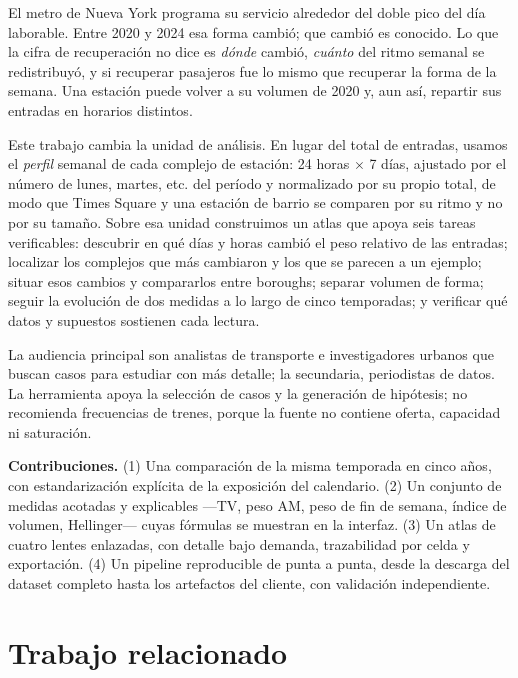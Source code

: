 \IfFileExists{IEEEtran.cls}{\documentclass[conference]{IEEEtran}}{\documentclass[10pt,twocolumn]{article}}
\begin{document}
El metro de Nueva York programa su servicio alrededor del doble pico del día laborable. Entre 2020 y 2024 esa forma cambió; que cambió es conocido. Lo que la cifra de recuperación no dice es \emph{dónde} cambió, \emph{cuánto} del ritmo semanal se redistribuyó, y si recuperar pasajeros fue lo mismo que recuperar la forma de la semana. Una estación puede volver a su volumen de 2020 y, aun así, repartir sus entradas en horarios distintos.

Este trabajo cambia la unidad de análisis. En lugar del total de entradas, usamos el \emph{perfil} semanal de cada complejo de estación: 24 horas $\times$ 7 días, ajustado por el número de lunes, martes, etc. del período y normalizado por su propio total, de modo que Times Square y una estación de barrio se comparen por su ritmo y no por su tamaño. Sobre esa unidad construimos un atlas que apoya seis tareas verificables: descubrir en qué días y horas cambió el peso relativo de las entradas; localizar los complejos que más cambiaron y los que se parecen a un ejemplo; situar esos cambios y compararlos entre boroughs; separar volumen de forma; seguir la evolución de dos medidas a lo largo de cinco temporadas; y verificar qué datos y supuestos sostienen cada lectura.

La audiencia principal son analistas de transporte e investigadores urbanos que buscan casos para estudiar con más detalle; la secundaria, periodistas de datos. La herramienta apoya la selección de casos y la generación de hipótesis; no recomienda frecuencias de trenes, porque la fuente no contiene oferta, capacidad ni saturación.

\textbf{Contribuciones.} (1) Una comparación de la misma temporada en cinco años, con estandarización explícita de la exposición del calendario. (2) Un conjunto de medidas acotadas y explicables ---TV, peso AM, peso de fin de semana, índice de volumen, Hellinger--- cuyas fórmulas se muestran en la interfaz. (3) Un atlas de cuatro lentes enlazadas, con detalle bajo demanda, trazabilidad por celda y exportación. (4) Un pipeline reproducible de punta a punta, desde la descarga del dataset completo hasta los artefactos del cliente, con validación independiente.

\section{Trabajo relacionado}
\end{document}
